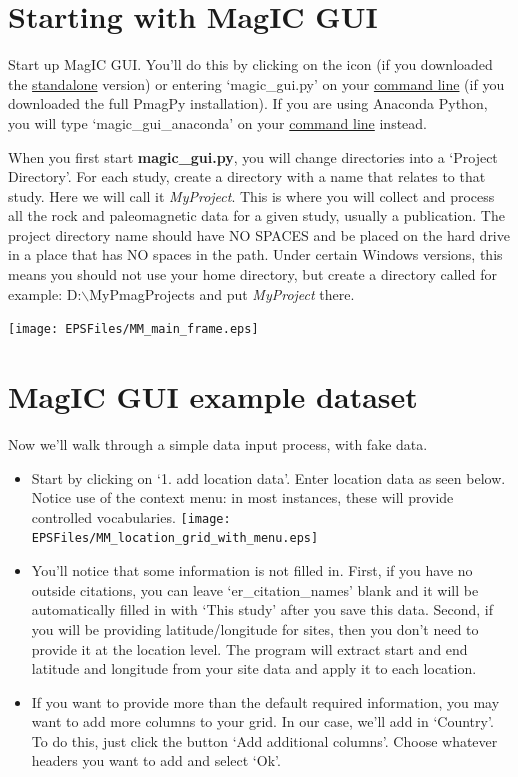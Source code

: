 \documentclass[11pt]{book}
\begin{document}
{\section{Starting with MagIC GUI}
Start up MagIC GUI.  You'll do this by clicking on the icon (if you downloaded the \href{#standalone}{standalone} version) or entering `magic\_gui.py' on your \href{#command_line}{command line} (if you downloaded the full PmagPy installation).  If you are using Anaconda Python, you will type `magic\_gui\_anaconda' on your \href{#command_line}{command line} instead.

When you first start {\bf magic\_gui.py}, you will change directories into a  `Project Directory'. For each study, create a directory with a name that relates to that study. Here we will call it {\it MyProject}.  This is where you will collect  and process all the rock and paleomagnetic data for a given study, usually a publication.   The project directory name should have NO SPACES and be placed on the hard drive in a place that has NO spaces in the path. Under certain Windows versions, this means you should not use your home directory, but create a directory called for example: D:$\backslash$MyPmagProjects and put {\it MyProject} there.

  \texttt{[image: EPSFiles/MM\_main\_frame.eps]}

\section{MagIC GUI example dataset}
Now we'll walk through a simple data input process, with fake data.
  \begin{itemize}
  \item Start by clicking on `1. add location data'.  Enter location data as seen below. Notice use of the context menu: in most instances, these will provide controlled vocabularies.
    \texttt{[image: EPSFiles/MM\_location\_grid\_with\_menu.eps]}
  \item You'll notice that some information is not filled in.  First, if you have no outside citations, you can leave `er\_citation\_names' blank and it will be automatically filled in with `This study' after you save this data.  Second, if you will be providing latitude/longitude for sites, then you don't need to provide it at the location level.  The program will extract start and end latitude and longitude from your site data and apply it to each location.
  \item If you want to provide more than the default required information, you may want to add more columns to your grid.  In our case, we'll add in `Country'.  To do this, just click the button `Add additional columns'.  Choose whatever headers you want to add and select `Ok'.


\end{itemize}}
\end{document}
